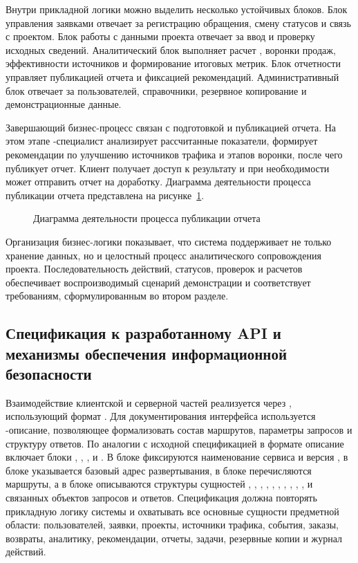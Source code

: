 Внутри прикладной логики можно выделить несколько устойчивых блоков. Блок управления заявками отвечает за регистрацию обращения, смену статусов и связь с проектом. Блок работы с данными проекта отвечает за ввод и проверку исходных сведений. Аналитический блок выполняет расчет , воронки продаж, эффективности источников и формирование итоговых метрик. Блок отчетности управляет публикацией отчета и фиксацией рекомендаций. Административный блок отвечает за пользователей, справочники, резервное копирование и демонстрационные данные.

Завершающий бизнес-процесс связан с подготовкой и публикацией отчета. На этом этапе -специалист анализирует рассчитанные показатели, формирует рекомендации по улучшению источников трафика и этапов воронки, после чего публикует отчет. Клиент получает доступ к результату и при необходимости может отправить отчет на доработку. Диаграмма деятельности процесса публикации отчета представлена на рисунке~\ref{fig:report-publication-activity}.

\begin{figure}[H]
    \centering
    \caption{Диаграмма деятельности процесса публикации отчета}
    \label{fig:report-publication-activity}
\end{figure}

Организация бизнес-логики показывает, что система поддерживает не только хранение данных, но и целостный процесс аналитического сопровождения  проекта. Последовательность действий, статусов, проверок и расчетов обеспечивает воспроизводимый сценарий демонстрации и соответствует требованиям, сформулированным во втором разделе.

\subsection{Спецификация к разработанному API и механизмы обеспечения информационной безопасности}

Взаимодействие клиентской и серверной частей реализуется через , использующий формат . Для документирования интерфейса используется -описание, позволяющее формализовать состав маршрутов, параметры запросов и структуру ответов. По аналогии с исходной спецификацией в формате  описание  включает блоки , , ,  и . В блоке  фиксируются наименование сервиса и версия , в блоке  указывается базовый адрес развертывания, в блоке  перечисляются маршруты, а в блоке  описываются структуры сущностей , , , , , , , , , ,  и связанных объектов запросов и ответов. Спецификация  должна повторять прикладную логику системы и охватывать все основные сущности предметной области: пользователей, заявки, проекты, источники трафика, события, заказы, возвраты, аналитику, рекомендации, отчеты, задачи, резервные копии и журнал действий.

